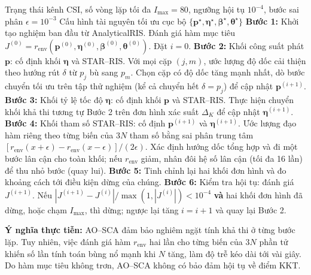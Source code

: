 \begin{algorithm}[htbp]
\caption{Tối ưu luân phiên với cập nhật lân cận (AO--SCA)}
\label{alg:ao-sca}
\begin{algorithmic}[1]
\Require Trạng thái kênh CSI, số vòng lặp tối đa $I_{\max} = 80$, ngưỡng hội tụ $10^{-4}$, bước sai phân
  $\epsilon = 10^{-3}$
\Ensure Cấu hình tài nguyên tối ưu cục bộ $\{\mathbf{p}^\star, \boldsymbol{\eta}^\star, \boldsymbol{\beta}^\star,
  \boldsymbol{\theta}^\star\}$
\State \textbf{Bước 1:} Khởi tạo nghiệm ban đầu từ AnalyticalRIS. Đánh giá hàm mục tiêu
  $J^{(0)} = r_{\mathrm{env}}(\mathbf{p}^{(0)}, \boldsymbol{\eta}^{(0)}, \boldsymbol{\beta}^{(0)},
  \boldsymbol{\theta}^{(0)})$. Đặt $i = 0$.
\State \textbf{Bước 2:} Khối công suất phát $\mathbf{p}$: cố định khối $\boldsymbol{\eta}$ và STAR--RIS. Với mọi
  cặp $(j, m)$, ước lượng độ dốc cải thiện theo hướng rút $\delta$ từ $p_j$ bù sang $p_m$. Chọn cặp có độ dốc tăng
  mạnh nhất, dò bước chuyển tối ưu trên tập thử nghiệm (kể cả chuyển hết $\delta = p_j$) để cập nhật
  $\mathbf{p}^{(i+1)}$.
\State \textbf{Bước 3:} Khối tỷ lệ tốc độ $\boldsymbol{\eta}$: cố định khối $\mathbf{p}$ và STAR--RIS. Thực hiện
  chuyển khối khả thi tương tự Bước 2 trên đơn hình xác suất $\Delta_K$ để cập nhật $\boldsymbol{\eta}^{(i+1)}$.
\State \textbf{Bước 4:} Khối tham số STAR--RIS: cố định $\mathbf{p}^{(i+1)}$ và $\boldsymbol{\eta}^{(i+1)}$. Ước
  lượng đạo hàm riêng theo từng biến của $3N$ tham số bằng sai phân trung tâm
  $[r_{\mathrm{env}}(x + \epsilon) - r_{\mathrm{env}}(x - \epsilon)]/(2\epsilon)$. Xác định hướng dốc tổng hợp và
  đi một bước lân cận cho toàn khối; nếu $r_{\mathrm{env}}$ giảm, nhân đôi hệ số lân cận (tối đa 16 lần) để thu
  nhỏ bước (quay lui).
\State \textbf{Bước 5:} Tinh chỉnh lại hai khối đơn hình và đo khoảng cách tới điều kiện dừng của chúng.
\State \textbf{Bước 6:} Kiểm tra hội tụ: đánh giá $J^{(i+1)}$. Nếu
  $|J^{(i+1)} - J^{(i)}|/\max(1, |J^{(i)}|) < 10^{-4}$ \textbf{và} hai khối đơn hình đã dừng, hoặc chạm
  $I_{\max}$, thì dừng; ngược lại tăng $i = i + 1$ và quay lại Bước 2.
\end{algorithmic}
\end{algorithm}

\textbf{Ý nghĩa thực tiễn:} AO--SCA đảm bảo nghiêm ngặt tính khả thi ở từng bước lặp. Tuy nhiên, việc đánh giá
hàm $r_{\mathrm{env}}$ hai lần cho từng biến của $3N$ phần tử khiến số lần tính toán bùng nổ mạnh khi $N$ tăng,
làm độ trễ kéo dài tới vài giây. Do hàm mục tiêu không trơn, AO--SCA không có bảo đảm hội tụ về điểm KKT.

